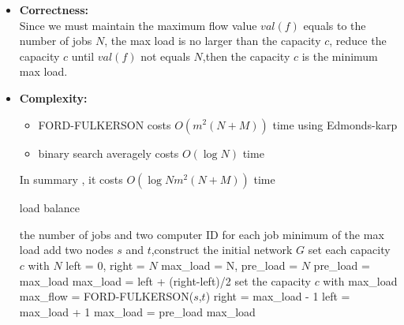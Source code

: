 \begin{itemize}
	\item \textbf{Correctness:} \\
		 Since we must maintain the maximum flow value $val(f)$ equals to the number of jobs $N$,
		 the max load is no larger than the capacity $c$, reduce the capacity $c$ until $val(f)$ not 
		 equals $N$,then the capacity $c$ is the minimum max load.
	\item \textbf{Complexity:} 
		\begin{itemize}
			\item FORD-FULKERSON costs $O(m^2(N+M))$ time using Edmonds-karp
			\item binary search averagely costs $O(\log N)$ time
		\end{itemize}
		In summary , it costs $O(\log N m^2(N+M))$ time
		\begin{algorithm}[H]
			\caption{load balance}
			\begin{algorithmic}[1]
				\Require  the number of jobs and two computer ID for each job 
				\Ensure   minimum of the max load	
				 {}
				\State add two nodes $s$ and $t$,construct the initial network $G$ 
				\State set each capacity $c$  with $N$
				\State left = $0$, right = $N$
				\State max\_load = N, pre\_load = $N$
				\State pre\_load = max\_load
				\State max\_load = left + (right-left)/2
				\State set the capacity $c$ with max\_load 
				\State max\_flow = FORD-FULKERSON($s$,$t$)
				\State right = max\_load - 1
				\Else
				\State left = max\_load + 1
				\EndIf 	
				\State max\_load = pre\_load
				\EndIf	  
				\EndWhile
				\State \Return max\_load 				 
				\EndFunction 
			\end{algorithmic} 
		\end{algorithm}	
\end{itemize}
 